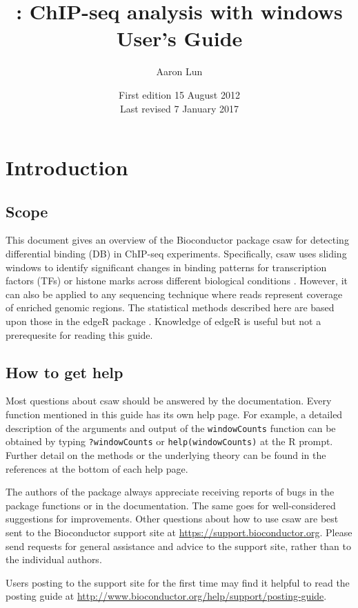 \documentclass[12pt]{report}
\title{\pkgname{}: ChIP-seq analysis with windows \\ \vspace{0.2in} User's Guide}
\author{Aaron Lun}
\date{First edition 15 August 2012\\
\vspace{6pt}
Last revised 7 January 2017}
\newcommand{\edger}{edgeR}
\newcommand{\pkgname}{csaw}
\newcommand{\code}[1]{{\small\texttt{#1}}}
\newcommand{\R}{\textsf{R}}
\begin{document}
\maketitle
\tableofcontents


\newpage
{}

\chapter{Introduction}
\section{Scope}
This document gives an overview of the Bioconductor package \pkgname{} for detecting differential binding (DB) in ChIP-seq experiments.
Specifically, \pkgname{} uses sliding windows to identify significant changes in binding patterns for transcription factors (TFs) or histone marks across different biological conditions \citep{lun2016csaw}.
However, it can also be applied to any sequencing technique where reads represent coverage of enriched genomic regions.
The statistical methods described here are based upon those in the \edger{} package \citep{robinson2010}. 
Knowledge of \edger{} is useful but not a prerequesite for reading this guide.

\section{How to get help}
Most questions about \pkgname{} should be answered by the documentation. 
Every function mentioned in this guide has its own help page. 
For example, a detailed description of the arguments and output of the \code{windowCounts} function can be obtained by typing \code{?windowCounts} or \code{help(windowCounts)} at the \R{} prompt. 
Further detail on the methods or the underlying theory can be found in the references at the bottom of each help page.

The authors of the package always appreciate receiving reports of bugs in the package functions or in the documentation. 
The same goes for well-considered suggestions for improvements. 
Other questions about how to use \pkgname{} are best sent to the Bioconductor support site at \url{https://support.bioconductor.org}.
Please send requests for general assistance and advice to the support site, rather than to the individual authors. 

Users posting to the support site for the first time may find it helpful to read the posting guide at \url{http://www.bioconductor.org/help/support/posting-guide}.
\end{document}

